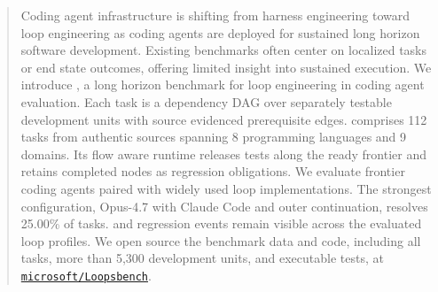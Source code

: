 \begin{abstract}
Coding agent infrastructure is shifting from harness engineering toward loop engineering as coding agents are deployed for sustained long horizon software development. Existing benchmarks often center on localized tasks or end state outcomes, offering limited insight into sustained execution. We introduce \lhb{}, a long horizon benchmark for loop engineering in coding agent evaluation. Each task is a dependency DAG over separately testable development units with source evidenced prerequisite edges. \lhb{} comprises 112 tasks from authentic sources spanning 8 programming languages and 9 domains. Its flow aware runtime releases tests along the ready frontier and retains completed nodes as regression obligations. We evaluate frontier coding agents paired with widely used loop implementations. The strongest configuration, Opus-4.7 with Claude Code and outer continuation, resolves 25.00\% of tasks.  and regression events remain visible across the evaluated loop profiles. We open source the benchmark data and code, including all tasks, more than 5{,}300 development units, and executable tests, at \href{https://github.com/microsoft/Loopsbench}{\texttt{microsoft/Loopsbench}}.
\end{abstract}
